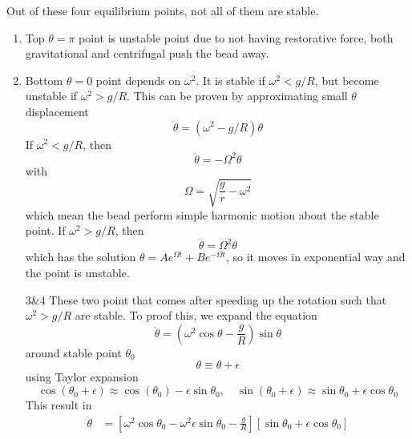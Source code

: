 \documentclass[../../../main.tex]{subfiles}
\begin{document}
Out of these four equilibrium points, not all of them are stable.
\begin{enumerate}
    \item Top $\theta=\pi$ point is unstable point due to not having restorative force, both gravitational and centrifugal push the bead away.
    \item Bottom $\theta=0$ point depends on $\omega^2$.
    It is stable if $\omega^2<g/R$, but become unstable if $\omega^2>g/R$.
    This can be proven by approximating small $\theta$ displacement
    \begin{equation*}
        \ddot{\theta}=\left(\omega^2-g/R\right)\theta
    \end{equation*} 
    If $\omega^2<g/R$, then
    \begin{equation*}
        \ddot{\theta}=-\Omega^2\theta
    \end{equation*}
    with
    \begin{equation*}
        \Omega=\sqrt{\frac{g}{r}-\omega^2}
    \end{equation*}
    which mean the bead perform simple harmonic motion about the stable point.
    If $\omega^2>g/R$, then 
    \begin{equation*}
        \ddot{\theta}=\Omega^2\theta
    \end{equation*}
    which has the solution $\theta=Ae^{\Omega t}+Be^{-\Omega t}$, so it moves in exponential way and the point is unstable.
    \item [3\&4] These two point that comes after speeding up the rotation such that $\omega^2>g/R$ are stable.
    To proof this, we expand the equation
    \begin{equation*}
        \ddot{\theta}=\left(\omega^2\cos\theta-\frac{g}{R}\right)\sin\theta
    \end{equation*}
    around stable point $\theta_0$
    \begin{equation*}
        \theta\equiv\theta+\epsilon
    \end{equation*}
    using Taylor expansion
    \begin{equation*}
        \cos(\theta_0+\epsilon)\approx\cos(\theta_0)-\epsilon\sin\theta_0,\quad\sin(\theta_0+\epsilon)\approx\sin\theta_0+\epsilon\cos\theta_0
    \end{equation*}
    This result in 
    \begin{align*}
        \ddot{\theta}&=\left[\omega^2\cos\theta_0-\omega^2\epsilon\sin\theta_0 -\frac{g}{R}\right]\left[\sin\theta_0+\epsilon\cos\theta_0\right]\\

\end{align*}
\end{enumerate}
\end{document}
